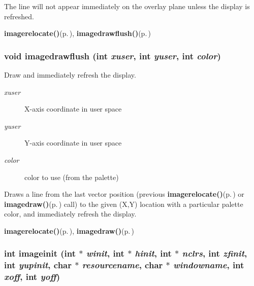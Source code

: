 The line will not appear immediately on the overlay plane unless the display is refreshed.

\begin{Desc}
\item[See also:]{\bf imagerelocate()}{\rm (p.\,\pageref{xtv_8h_a72})}, {\bf imagedrawflush()}{\rm (p.\,\pageref{xtv_8h_a74})} \end{Desc}
\subsubsection{\setlength{\rightskip}{0pt plus 5cm}void imagedrawflush (int {\em xuser}, int {\em yuser}, int {\em color})}\label{xtvutils_8c_a180}


Draw and immediately refresh the display. 

\begin{Desc}
\item[Parameters:]
\begin{description}
\item[{\em xuser}]X-axis coordinate in user space \item[{\em yuser}]Y-axis coordinate in user space \item[{\em color}]color to use (from the palette)\end{description}
\end{Desc}
Draws a line from the last vector position (previous {\bf imagerelocate()}{\rm (p.\,\pageref{xtv_8h_a72})} or {\bf imagedraw()}{\rm (p.\,\pageref{xtv_8h_a73})} call) to the given (X,Y) location with a particular palette color, and immediately refresh the display.

\begin{Desc}
\item[See also:]{\bf imagerelocate()}{\rm (p.\,\pageref{xtv_8h_a72})}, {\bf imagedraw()}{\rm (p.\,\pageref{xtv_8h_a73})} \end{Desc}
\subsubsection{\setlength{\rightskip}{0pt plus 5cm}int imageinit (int $\ast$ {\em winit}, int $\ast$ {\em hinit}, int $\ast$ {\em nclrs}, int {\em zfinit}, int {\em yupinit}, char $\ast$ {\em resourcename}, char $\ast$ {\em windowname}, int {\em xoff}, int {\em yoff})}\label{xtvutils_8c_a165}


